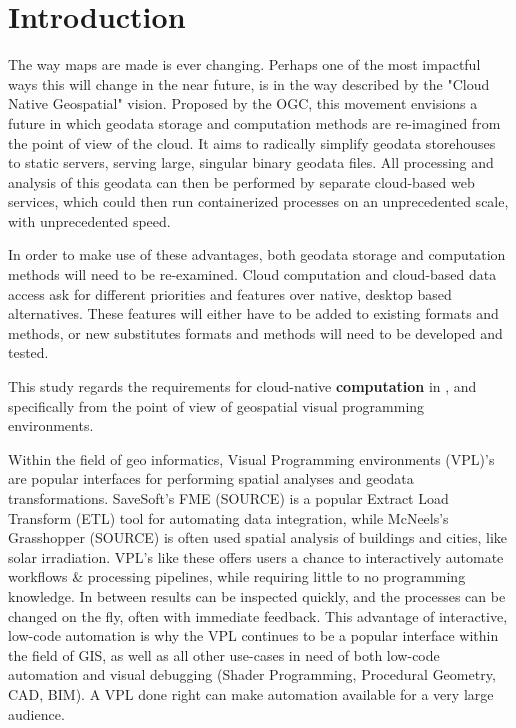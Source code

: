 \chapter{Introduction}
The way maps are made is ever changing. Perhaps one of the most impactful ways this will change in the near future, is in the way described by the "Cloud Native Geospatial" vision. Proposed by the OGC, this movement envisions a future in which geodata storage and computation methods are re-imagined from the point of view of the cloud. 
It aims to radically simplify geodata storehouses to static servers, serving large, singular binary geodata files. All processing and analysis of this geodata can then be performed by separate cloud-based web services, which could then run containerized processes on an unprecedented scale, with unprecedented speed. 

In order to make use of these advantages, both geodata storage and computation methods will need to be re-examined. 
Cloud computation and cloud-based data access ask for different priorities and features over native, desktop based alternatives. 
These features will either have to be added to existing formats and methods, or new substitutes formats and methods will need to be developed and tested.

This study regards the requirements for cloud-native \textbf{computation} in , and specifically from the point of view of geospatial visual programming environments. 

Within the field of geo informatics, Visual Programming environments (VPL)'s are popular interfaces for performing spatial analyses and geodata transformations. 
SaveSoft's FME (SOURCE) is a popular Extract Load Transform (ETL) tool for automating data integration, while McNeels's Grasshopper (SOURCE) is often used spatial analysis of buildings and cities, like solar irradiation. 
VPL's like these offers users a chance to interactively automate workflows \& processing pipelines, while requiring little to no programming knowledge. 
In between results can be inspected quickly, and the processes can be changed on the fly, often with immediate feedback.
This advantage of interactive, low-code automation is why the VPL continues to be a popular interface within the field of GIS, as well as all other use-cases in need of both low-code automation and visual debugging (Shader Programming, Procedural Geometry, CAD, BIM). 
A VPL done right can make automation available for a very large audience.

